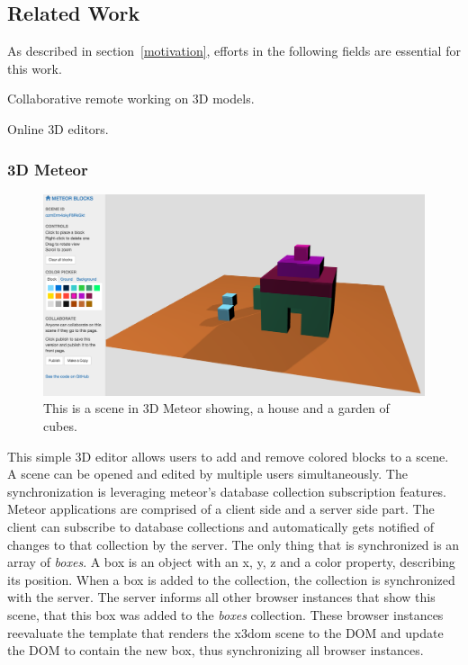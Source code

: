 \subsection{Related Work}
\label{related-work}

As described in section~\ref{motivation}, efforts in the following fields are essential for this work.

\begin{itemize*}
  \item Collaborative remote working on \gls{3D} models.
  \item Online \gls{3D} editors.
\end{itemize*}

\subsubsection{3D Meteor}
\label{d-meteor0}

\begin{figure}[htbp]
  \centering
  \includegraphics[width=12cm]{../assets/3dmeteor.png}
  \caption{This is a scene in 3D Meteor showing, a house and a garden of cubes.}
	\label{fig:3dmeteor}
\end{figure}

This simple \gls{3D} editor allows users to add and remove colored blocks to a
scene. A scene can be opened and edited by multiple users simultaneously. The synchronization is leveraging meteor's database collection
subscription features. Meteor applications are comprised of a client side and a
server side part. The client can subscribe to database collections and
automatically gets notified of changes to that collection by the server. The only
thing that is synchronized is an array of \emph{boxes}. A box is an
object with an x, y, z and a color property, describing its position. When a box is
added to the collection, the collection is synchronized with the server. The
server informs all other browser instances that show this scene, that this box was added to the \emph{boxes} collection.
These browser instances reevaluate the template that renders the x3dom scene to
the \gls{DOM} and update the \gls{DOM} to contain the new box, thus synchronizing
all browser instances. \cite{3dmeteor}

